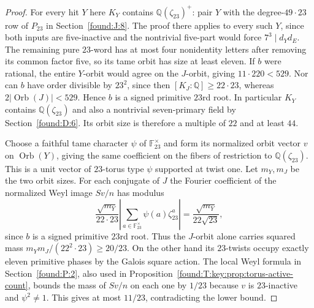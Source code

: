 \documentclass[11pt,a4paper]{article}
\numberwithin{equation}{section}
\theoremstyle{remark}
\begin{document}
\begin{proof}
For every hit $Y$ here $K_Y$ contains
$\mathbb Q(\zeta_{23})^+$: pair $Y$ with the degree-$49\cdot23$ row
of $P_{23}$ in Section~\ref{found:J:8}. The proof there applies to every such
$Y$, since both inputs are five-inactive and the nontrivial
five-part would force $7^3\mid d_Yd_E$. The remaining pure
$23$-word has at most four nonidentity letters after removing its
common factor five, so its tame orbit has size at least eleven.
If $b$ were rational, the entire $Y$-orbit would agree on the
$J$-orbit, giving $11\cdot220<529$. Nor can $b$ have order divisible
by $23^2$, since then $[K_J:\mathbb Q]\ge22\cdot23$, whereas
$2|\operatorname{Orb}(J)|<529$. Hence $b$ is a signed primitive
$23$rd root. In particular $K_Y$ contains $\mathbb Q(\zeta_{23})$
and also a nontrivial seven-primary field by Section~\ref{found:D:6}.
Its orbit size is therefore a multiple of $22$ and at least $44$.

Choose a faithful tame character $\psi$ of
$\mathbb F_{23}^\times$ and form its normalized orbit vector $v$
on $\operatorname{Orb}(Y)$, giving the same coefficient on the
fibers of restriction to $\mathbb Q(\zeta_{23})$. This is a unit
vector of $23$-torus type $\psi$ supported at twist one. Let
$m_Y,m_J$ be the two orbit sizes. For each conjugate of $J$ the
Fourier coefficient of the normalized Weyl image $Sv/n$ has modulus
\[
       \frac{\sqrt{m_Y}}{22\cdot23}
       \left|\sum_{a\in\mathbb F_{23}^{\times}}\psi(a)\zeta_{23}^{a}\right|
       =\frac{\sqrt{m_Y}}{22\sqrt{23}},
\]
since $b$ is a signed primitive $23$rd root. Thus the $J$-orbit
alone carries squared mass $m_Ym_J/(22^2\cdot23)\ge20/23$.
On the other hand its $23$-twists occupy exactly eleven primitive
phases by the Galois square action. The local Weyl formula in Section~\ref{found:P:2}, also used in Proposition~\ref{found:T:key:prop:torus-active-count},
bounds the mass of $Sv/n$ on each one by $1/23$ because $v$ is
$23$-inactive and $\psi^2\ne1$. This gives at most $11/23$,
contradicting the lower bound.
\end{proof}
\end{document}

